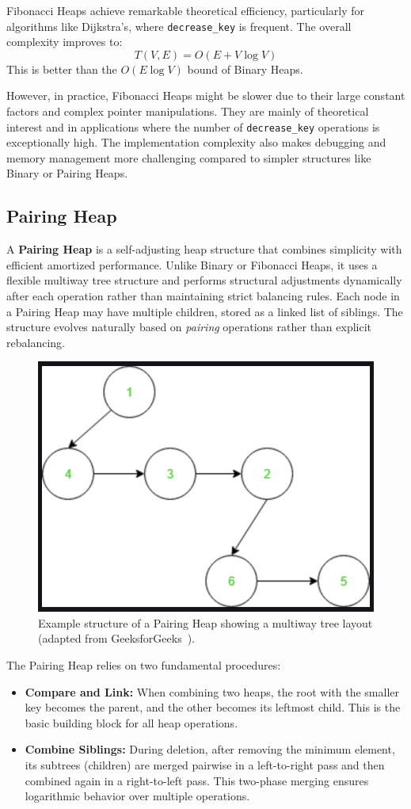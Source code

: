 \documentclass[acmsmall]{acmart}
\begin{document}
Fibonacci Heaps achieve remarkable theoretical efficiency, particularly for algorithms like Dijkstra’s, where \texttt{decrease\_key} is frequent. The overall complexity improves to:
\[
T(V, E) = O(E + V \log V)
\]
This is better than the $O(E \log V)$ bound of Binary Heaps.  

\vspace{1em}
However, in practice, Fibonacci Heaps might be slower due to their large constant factors and complex pointer manipulations. They are mainly of theoretical interest and in applications where the number of \texttt{decrease\_key} operations is exceptionally high. The implementation complexity also makes debugging and memory management more challenging compared to simpler structures like Binary or Pairing Heaps.

\subsection{Pairing Heap}
A \textbf{Pairing Heap} is a self-adjusting heap structure that combines simplicity with efficient amortized performance. Unlike Binary or Fibonacci Heaps, it uses a flexible multiway tree structure and performs structural adjustments dynamically after each operation rather than maintaining strict balancing rules. Each node in a Pairing Heap may have multiple children, stored as a linked list of siblings. The structure evolves naturally based on \emph{pairing} operations rather than explicit rebalancing.

\begin{figure}[H]
  \centering
  \includegraphics[width=0.55\linewidth]{figs/pairing_heap.png}
  \caption{Example structure of a Pairing Heap showing a multiway tree layout (adapted from GeeksforGeeks~\cite{geeksforgeeks_pairingheap}).}
  \label{fig:pairingheap}
\end{figure}

The Pairing Heap relies on two fundamental procedures:
\begin{itemize}
  \item \textbf{Compare and Link:} When combining two heaps, the root with the smaller key becomes the parent, and the other becomes its leftmost child. This is the basic building block for all heap operations.
  \item \textbf{Combine Siblings:} During deletion, after removing the minimum element, its subtrees (children) are merged pairwise in a left-to-right pass and then combined again in a right-to-left pass. This two-phase merging ensures logarithmic behavior over multiple operations.
\end{itemize}
\end{document}
